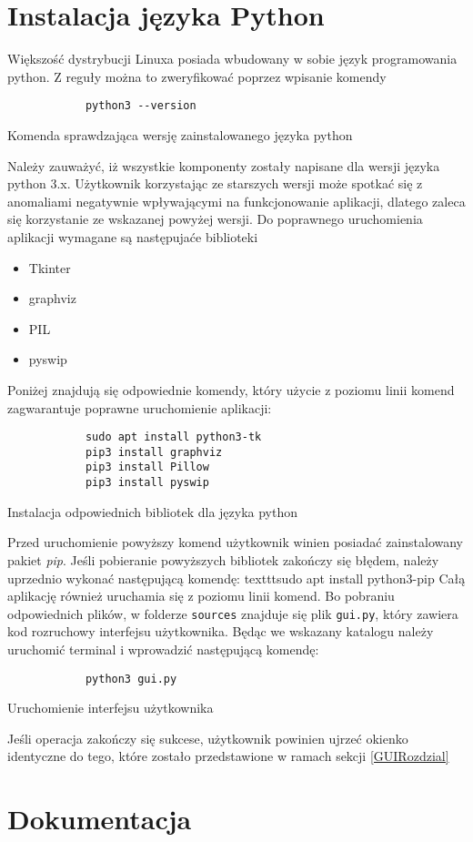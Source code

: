 \section{Instalacja języka Python}
    Większość dystrybucji Linuxa posiada wbudowany w sobie język programowania python. Z reguły można to zweryfikować poprzez wpisanie komendy 
    \begin{listing}[H]
        \begin{verbatim}
            python3 --version
        \end{verbatim}
        \caption{Komenda sprawdzająca wersję zainstalowanego języka python}
    \end{listing}
    Należy zauważyć, iż wszystkie komponenty zostały napisane dla wersji języka python 3.x. Użytkownik korzystając ze starszych wersji 
    może spotkać się z anomaliami negatywnie wpływającymi na funkcjonowanie aplikacji, dlatego zaleca się korzystanie ze wskazanej powyżej wersji.
    Do poprawnego uruchomienia aplikacji wymagane są następujaće biblioteki 
    \begin{itemize}
        \item Tkinter
        \item graphviz 
        \item PIL
        \item pyswip
    \end{itemize}
    Poniżej znajdują się odpowiednie komendy, który użycie z poziomu linii komend zagwarantuje poprawne uruchomienie aplikacji:
    \begin{listing}[H]
        \begin{verbatim}
            sudo apt install python3-tk
            pip3 install graphviz
            pip3 install Pillow
            pip3 install pyswip
        \end{verbatim}
        \caption{Instalacja odpowiednich bibliotek dla języka python}
    \end{listing}
    Przed uruchomienie powyższy komend użytkownik winien posiadać zainstalowany pakiet \textit{pip}. Jeśli pobieranie powyższych bibliotek zakończy 
    się błędem, należy uprzednio wykonać następującą komendę: texttt{sudo apt install python3-pip}
    Całą aplikację również uruchamia się z poziomu linii komend. Bo pobraniu odpowiednich plików, w folderze \texttt{sources} znajduje się plik
    \texttt{gui.py}, który zawiera kod rozruchowy interfejsu użytkownika. Będąc we wskazany katalogu należy uruchomić terminal i wprowadzić następującą
    komendę:
    \begin{listing}[H]
        \begin{verbatim}
            python3 gui.py
        \end{verbatim}
        \caption{Uruchomienie interfejsu użytkownika}
    \end{listing}
    Jeśli operacja zakończy się sukcese, użytkownik powinien ujrzeć okienko identyczne do tego, które zostało przedstawione w ramach sekcji \ref{GUIRozdzial}

\section{Dokumentacja}
